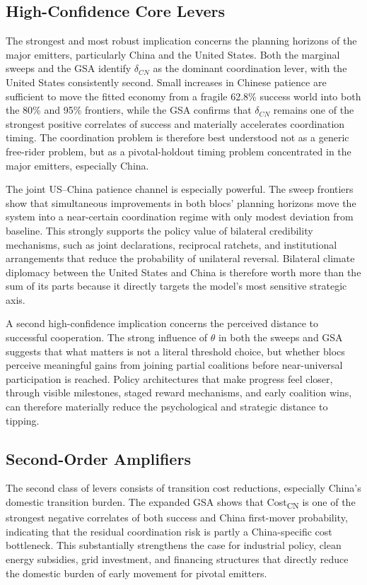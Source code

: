 \documentclass[12pt,a4paper]{article}
\begin{document}
\subsection{High-Confidence Core Levers}

The strongest and most robust implication concerns the planning horizons of the major emitters, particularly China and the United States. Both the marginal sweeps and the GSA identify $\delta_{CN}$ as the dominant coordination lever, with the United States consistently second. Small increases in Chinese patience are sufficient to move the fitted economy from a fragile 62.8\% success world into both the 80\% and 95\% frontiers, while the GSA confirms that $\delta_{CN}$ remains one of the strongest positive correlates of success and materially accelerates coordination timing. The coordination problem is therefore best understood not as a generic free-rider problem, but as a pivotal-holdout timing problem concentrated in the major emitters, especially China.

The joint US--China patience channel is especially powerful. The sweep frontiers show that simultaneous improvements in both blocs' planning horizons move the system into a near-certain coordination regime with only modest deviation from baseline. This strongly supports the policy value of bilateral credibility mechanisms, such as joint declarations, reciprocal ratchets, and institutional arrangements that reduce the probability of unilateral reversal. Bilateral climate diplomacy between the United States and China is therefore worth more than the sum of its parts because it directly targets the model's most sensitive strategic axis.

A second high-confidence implication concerns the perceived distance to successful cooperation. The strong influence of $\theta$ in both the sweeps and GSA suggests that what matters is not a literal threshold choice, but whether blocs perceive meaningful gains from joining partial coalitions before near-universal participation is reached. Policy architectures that make progress feel closer, through visible milestones, staged reward mechanisms, and early coalition wins, can therefore materially reduce the psychological and strategic distance to tipping.

\subsection{Second-Order Amplifiers}

The second class of levers consists of transition cost reductions, especially China's domestic transition burden. The expanded GSA shows that Cost\textsubscript{CN} is one of the strongest negative correlates of both success and China first-mover probability, indicating that the residual coordination risk is partly a China-specific cost bottleneck. This substantially strengthens the case for industrial policy, clean energy subsidies, grid investment, and financing structures that directly reduce the domestic burden of early movement for pivotal emitters.
\end{document}

